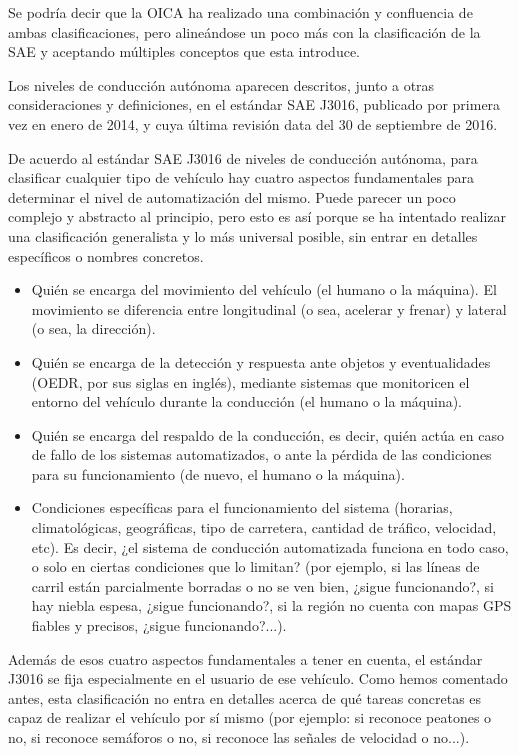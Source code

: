 \documentclass{pclass}
\begin{document}
Se podría decir que la OICA ha realizado una combinación y confluencia de ambas clasificaciones, pero alineándose un poco más con la clasificación de la SAE y aceptando múltiples conceptos que esta introduce.

Los niveles de conducción autónoma aparecen descritos, junto a otras consideraciones y definiciones, en el estándar SAE J3016, publicado por primera vez en enero de 2014, y cuya última revisión data del 30 de septiembre de 2016.

De acuerdo al estándar SAE J3016 de niveles de conducción autónoma, para clasificar cualquier tipo de vehículo hay cuatro aspectos fundamentales para determinar el nivel de automatización del mismo. Puede parecer un poco complejo y abstracto al principio, pero esto es así porque se ha intentado realizar una clasificación generalista y lo más universal posible, sin entrar en detalles específicos o nombres concretos.

\begin{itemize}
	\item Quién se encarga del movimiento del vehículo (el humano o la máquina). El movimiento se diferencia entre longitudinal (o sea, acelerar y frenar) y lateral (o sea, la dirección).
	
	\item Quién se encarga de la detección y respuesta ante objetos y eventualidades (OEDR, por sus siglas en inglés), mediante sistemas que monitoricen el entorno del vehículo durante la conducción (el humano o la máquina).
	
	\item Quién se encarga del respaldo de la conducción, es decir, quién actúa en caso de fallo de los sistemas automatizados, o ante la pérdida de las condiciones para su funcionamiento (de nuevo, el humano o la máquina).
	
	\item Condiciones específicas para el funcionamiento del sistema (horarias, climatológicas, geográficas, tipo de carretera, cantidad de tráfico, velocidad, etc). Es decir, ¿el sistema de conducción automatizada funciona en todo caso, o solo en ciertas condiciones que lo limitan? (por ejemplo, si las líneas de carril están parcialmente borradas o no se ven bien, ¿sigue funcionando?, si hay niebla espesa, ¿sigue funcionando?, si la región no cuenta con mapas GPS fiables y precisos, ¿sigue funcionando?...). 
	
\end{itemize}

Además de esos cuatro aspectos fundamentales a tener en cuenta, el estándar J3016 se fija especialmente en el usuario de ese vehículo. Como hemos comentado antes, esta clasificación no entra en detalles acerca de qué tareas concretas es capaz de realizar el vehículo por sí mismo (por ejemplo: si reconoce peatones o no, si reconoce semáforos o no, si reconoce las señales de velocidad o no...).
\end{document}
